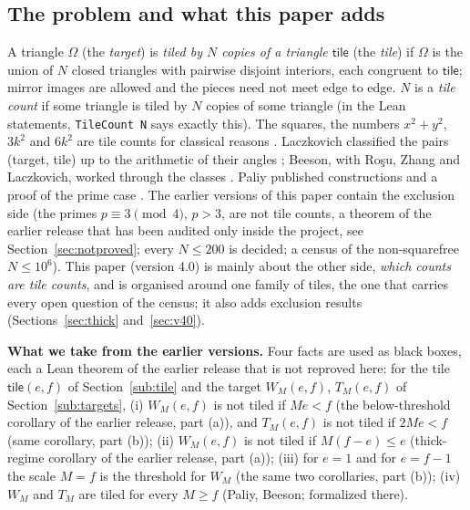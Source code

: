 \documentclass[11pt,reqno]{amsart}
\theoremstyle{plain}
\theoremstyle{definition}
\newcommand{\tile}{\mathsf{tile}}
\begin{document}
\subsection{The problem and what this paper adds}
A triangle $\Omega$ (the \emph{target}) is \emph{tiled by $N$ copies of a triangle $\tile$} (the \emph{tile}) if $\Omega$ is the union of $N$ closed triangles with pairwise disjoint interiors, each congruent to $\tile$; mirror images are allowed and the pieces need not meet edge to edge.
$N$ is a \emph{tile count} if some triangle is tiled by $N$ copies of some triangle (in the Lean statements, \texttt{TileCount N} says exactly this).
The squares, the numbers $x^2+y^2$, $3k^2$ and $6k^2$ are tile counts for classical reasons \cite{Soifer,SWW}.
Laczkovich classified the pairs (target, tile) up to the arithmetic of their angles \cite{Laczkovich1995,Laczkovich2012}; Beeson, with Ro\c{s}u, Zhang and Laczkovich, worked through the classes \cite{BeesonI,BeesonIII,BeesonIso,BeesonRosu,Zhang,Erdos633}.
Paliy published constructions and a proof of the prime case \cite{PaliyPrime,PaliyRepo}.
The earlier versions of this paper \cite{Release22,ReleasePaper} contain the exclusion side (the primes $p\equiv3\pmod4$, $p>3$, are not tile counts, a theorem of the earlier release that has been audited only inside the project, see Section~\ref{sec:notproved}; every $N\le200$ is decided; a census of the non-squarefree $N\le10^6$).
This paper (version 4.0) is mainly about the other side, \emph{which counts are tile counts}, and is organised around one family of tiles, the one that carries every open question of the census; it also adds exclusion results (Sections~\ref{sec:thick} and~\ref{sec:v40}).

\medskip\noindent\textbf{What we take from the earlier versions.} Four facts are used as black boxes, each a Lean theorem of the earlier release \cite{ReleasePaper,Release22} that is not reproved here: for the tile $\tile(e,f)$ of Section~\ref{sub:tile} and the target $W_M(e,f)$, $T_M(e,f)$ of Section~\ref{sub:targets},
(i) $W_M(e,f)$ is not tiled if $Me<f$ (the below-threshold corollary of the earlier release, part (a)), and $T_M(e,f)$ is not tiled if $2Me<f$ (same corollary, part (b));
(ii) $W_M(e,f)$ is not tiled if $M(f-e)\le e$ (thick-regime corollary of the earlier release, part (a));
(iii) for $e=1$ and for $e=f-1$ the scale $M=f$ is the threshold for $W_M$ (the same two corollaries, part (b));
(iv) $W_M$ and $T_M$ are tiled for every $M\ge f$ (Paliy, Beeson; formalized there).
\end{document}
